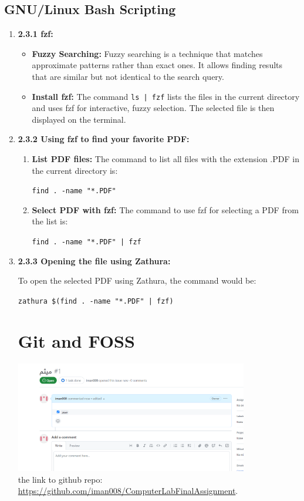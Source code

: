 \documentclass{article}
\begin{document}
\subsection{GNU/Linux Bash Scripting}
\begin{enumerate}
    \item \textbf{2.3.1 fzf:}
    
    \begin{itemize}
        \item \textbf{Fuzzy Searching:} Fuzzy searching is a technique that matches approximate patterns rather than exact ones. It allows finding results that are similar but not identical to the search query.

        \item \textbf{Install fzf:} The command \texttt{ls | fzf} lists the files in the current directory and uses fzf for interactive, fuzzy selection. The selected file is then displayed on the terminal.
    \end{itemize}

    \item \textbf{2.3.2 Using fzf to find your favorite PDF:}
    
    \begin{enumerate}
        \item \textbf{List PDF files:} The command to list all files with the extension .PDF in the current directory is:
        
        \texttt{find . -name "*.PDF"}

        \item \textbf{Select PDF with fzf:} The command to use fzf for selecting a PDF from the list is:
        
        \texttt{find . -name "*.PDF" | fzf}
    \end{enumerate}

    \item \textbf{2.3.3 Opening the file using Zathura:}

    To open the selected PDF using Zathura, the command would be:

    \texttt{zathura \$(find . -name "*.PDF" | fzf)}
    
    
\section{Git and FOSS}


\includegraphics[width=0.8\textwidth]{meysam.png}\\
the link to github repo: \url{https://github.com/iman008/ComputerLabFinalAssignment}.




\end{enumerate}
\end{document}
